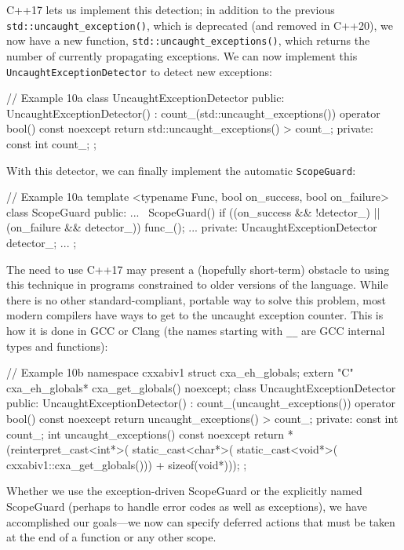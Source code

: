 C++17 lets us implement this detection; in addition to the previous \texttt{std::uncaught\_exception()}, which is deprecated (and removed in C++20), we now have a new function, \texttt{std::uncaught\_exceptions()}, which returns the number of currently propagating exceptions. We can now implement this \texttt{UncaughtExceptionDetector} to detect new exceptions:

\begin{code}
// Example 10a
class UncaughtExceptionDetector {
  public:
  UncaughtExceptionDetector() :
    count_(std::uncaught_exceptions()) {}
  operator bool() const noexcept {
    return std::uncaught_exceptions() > count_;
  }
  private:
  const int count_;
};
\end{code}

With this detector, we can finally implement the automatic \texttt{ScopeGuard}:

\begin{code}
// Example 10a
template <typename Func, bool on_success, bool on_failure>
class ScopeGuard {
  public:
  ...
  ~ScopeGuard() {
  if ((on_success && !detector_) ||
      (on_failure && detector_)) func_();
  }
  ...
  private:
  UncaughtExceptionDetector detector_;
  ...
};
\end{code}

The need to use C++17 may present a (hopefully short-term) obstacle to using this technique in programs constrained to older versions of the language. While there is no other standard-compliant, portable way to solve this problem, most modern compilers have ways to get to the uncaught exception counter. This is how it is done in GCC or Clang (the names starting with \texttt{\_\_} are GCC internal types and functions):

\begin{code}
// Example 10b
namespace  cxxabiv1 {
  struct cxa_eh_globals;
  extern "C" cxa_eh_globals* cxa_get_globals() noexcept;
}
class UncaughtExceptionDetector {
  public:
  UncaughtExceptionDetector() :
    count_(uncaught_exceptions()) {}
  operator bool() const noexcept {
    return uncaught_exceptions() > count_;
  }
  private:
  const int count_;
  int uncaught_exceptions() const noexcept {
    return *(reinterpret_cast<int*>(
      static_cast<char*>( static_cast<void*>(
        cxxabiv1::cxa_get_globals())) + sizeof(void*)));
  }
};
\end{code}

Whether we use the exception-driven ScopeGuard or the explicitly named ScopeGuard (perhaps to handle error codes as well as exceptions), we have accomplished our goals---we now can specify deferred actions that must be taken at the end of a function or any other scope.

